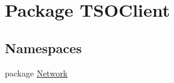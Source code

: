 \hypertarget{namespace_t_s_o_client}{\section{Package T\+S\+O\+Client}
\label{namespace_t_s_o_client}
}
\subsection*{Namespaces}
\begin{DoxyCompactItemize}
\item 
package \hyperlink{namespace_t_s_o_client_1_1_network}{Network}
\end{DoxyCompactItemize}

